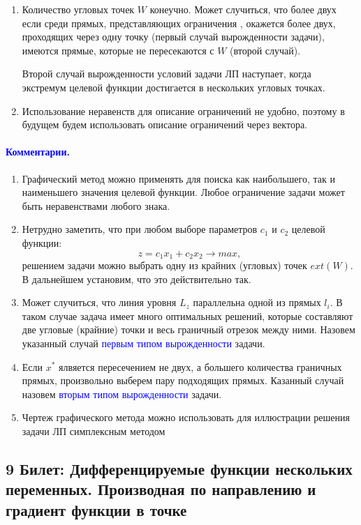 \documentclass[14pt, letterpaper]{article}
\begin{document}
\begin{enumerate}
    \item Количество угловых точек $W$ конеучно. Может случиться, что более двух если среди прямых, представляющих ограничения , окажется более двух, проходящих через одну точку (первый случай вырожденности задачи), имеются прямые, которые не пересекаются с $W$ (второй случай).

    Второй случай вырожденности условий задачи ЛП наступает, когда экстремум целевой функции достигается в нескольких угловых точках.
    
    \item Использование неравенств для описание ограничений не удобно, поэтому в будущем будем использовать описание ограничений через вектора.
\end{enumerate}

\paragraph{\textcolor{blue}{Комментарии.}}
\begin{enumerate}
    \item Графический метод можно применять для поиска как наибольшего, так и наименьшего значения целевой функции. Любое ограничение задачи может быть неравенствами любого знака.
    
    \item Нетрудно заметить, что при любом выборе параметров $c_{1}$ и $c_{2}$ целевой функции:
    $$z = c_{1}x_{1} + c_{2}x_{2} \rightarrow max, $$
    решением задачи можно выбрать одну из крайних (угловых) точек $ext(W)$. В дальнейшем установим, что это действительно так.
    
    \item Может случиться, что линия уровня $L_{z}$ параллельна одной из прямых $l_{i}$. В таком случае задача имеет много оптимальных решений, которые составляют две угловые (крайние) точки и весь граничный отрезок между ними.
    Назовем указанный случай \textcolor{blue}{первым типом вырожденности} задачи.
    \item Если $x^{*}$ ялвяется пересечением не двух, а большего количества граничных прямых, произвольно выберем пару подходящих прямых. Казанный случай назовем \textcolor{blue}{вторым типом вырожденности} задачи.
    \item Чертеж графического метода можно использовать для иллюстрации решения задачи ЛП симплексным методом
\end{enumerate}


\newpage
\subsection{9 Билет: Дифференцируемые функции нескольких переменных. Производная по направлению и градиент функции в точке}
\end{document}

